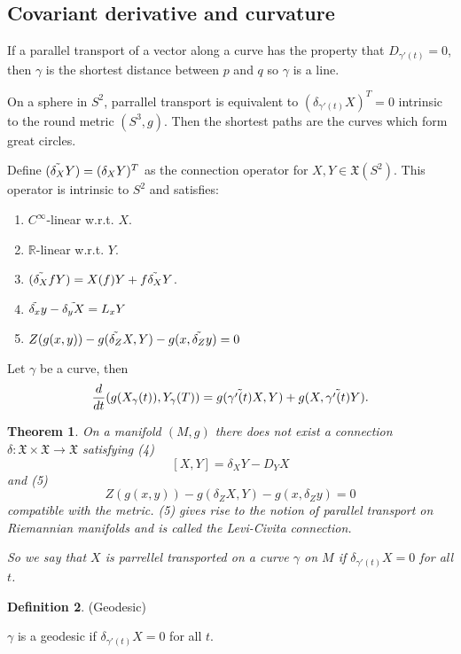 \documentclass{article}
\newtheorem{theorem}{Theorem}[section]
\theoremstyle{definition}
\newtheorem{defn}[theorem]{Definition}
\newenvironment{definition}
  {\vspace{8pt}\begin{mdframed}[backgroundcolor=blueish]\begin{defn}}
  {\end{defn}\end{mdframed}\vspace{4pt}}
\begin{document}
\subsection{Covariant derivative and curvature}

If a parallel transport of a vector along a curve has the property that $D_{\gamma'(t)} = 0$, then $\gamma$ is the shortest distance between $p$ and $q$ so $\gamma$ is a line.

On a sphere in $S^2$, parrallel transport is equivalent to $(\delta _{\gamma'(t)} X )^T = 0$ intrinsic to the round metric $(S^3, g)$. Then the shortest paths are the curves which form great circles.



Define $(\Tilde{\delta _{X}} Y)= (\delta_X Y)^T $ as the connection operator for $X,Y\in \mathfrak{X}(S^2)$. This operator is intrinsic to $S^2$ and satisfies:
\begin{enumerate}
    \item $C^\infty$-linear  w.r.t. $X$.
    \item $\mathbb R$-linear  w.r.t. $Y$.
    \item $(\Tilde{\delta _{X}} fY) = X(f)Y + f\Tilde{\delta_X}Y$.
    \item $\Tilde{\delta_x}y - \Tilde{\delta_y X} = L_x Y$
    \item $Z(g(x,y)) - g(\Tilde{\delta_Z} X,Y) - g(x, \Tilde{\delta_Z}y) = 0$
    
\end{enumerate}

Let $\gamma$ be a curve, then 
\[
\frac{d}{dt} (g(X_\gamma(t)), Y_\gamma (T)) = g(\Tilde{\gamma'(t)}X, Y ) + g(X, \Tilde{\gamma'(t)} Y). 
\]

\begin{theorem}
On a manifold $(M, g)$ there does not exist a connection $\delta : \mathfrak X \times  \mathfrak X \rightarrow \mathfrak X$ satisfying (4)
\[
[X, Y] = \delta_X Y - D_Y X
\]
and (5)
\[
Z(g(x,y)) - g(\delta_Z X,Y) - g(x, \delta_Z y) = 0
\]
compatible with the metric. (5) gives rise to the notion of parallel transport on Riemannian manifolds and is called the Levi-Civita connection.

So we say that $X$ is parrellel transported on a curve $\gamma$ on $M$ if $\delta_{\gamma'(t)} X = 0$ for all $t$.

\end{theorem}


\begin{definition} (Geodesic)
 
$\gamma$ is a geodesic if  $\delta_{\gamma'(t)} X = 0$ for all $t$.

\end{definition}
\end{document}
